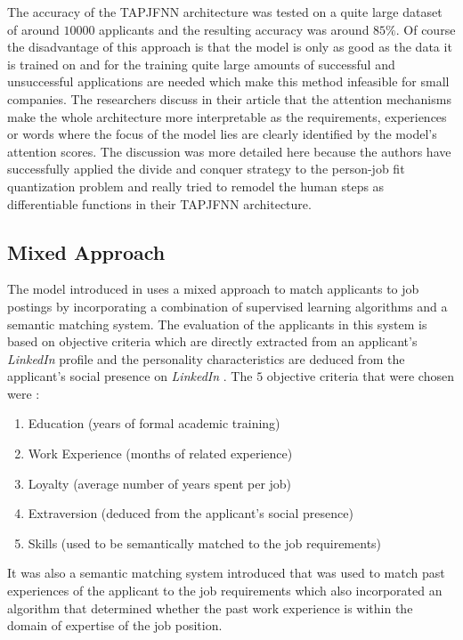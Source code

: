 \documentclass[draft,final]{thesisclass} %
\begin{document}
The accuracy of the \acs{TAPJFNN} architecture was tested on a quite large dataset of around $10000$ applicants and the resulting accuracy was around $85\%$.
Of course the disadvantage of this approach is that the model is only as good as the data it is trained on and for the training quite large amounts of successful and unsuccessful applications are needed which make this method infeasible for small companies.
The researchers discuss in their article that the attention mechanisms make the whole architecture more interpretable as the requirements, experiences or words where the focus of the model lies are clearly identified by the model's attention scores.
The discussion was more detailed here because the authors have successfully applied the divide and conquer strategy to the person-job fit quantization problem and really tried to remodel the human steps as differentiable functions in their \acs{TAPJFNN} architecture.

\subsection{Mixed Approach}
The model introduced in \textcite[517]{applicant_semantic_matching} uses a mixed approach to match applicants to job postings by incorporating a combination of supervised learning algorithms and a semantic matching system.
The evaluation of the applicants in this system is based on objective criteria which are directly extracted from an applicant's \textit{LinkedIn} profile and the personality characteristics are deduced from the applicant's social presence on \textit{LinkedIn} \parencite[517]{applicant_semantic_matching}.
The $5$ objective criteria that were chosen were \parencite[518]{applicant_semantic_matching}:
\begin{enumerate}
    \item Education (years of formal academic training)
    \item Work Experience (months of related experience)
    \item Loyalty (average number of years spent per job)
    \item Extraversion (deduced from the applicant's social presence)
    \item Skills (used to be semantically matched to the job requirements)
\end{enumerate}
It was also a semantic matching system introduced that was used to match past experiences of the applicant to the job requirements which also incorporated an algorithm that determined whether the past work experience is within the domain of expertise of the job position.
\end{document}
